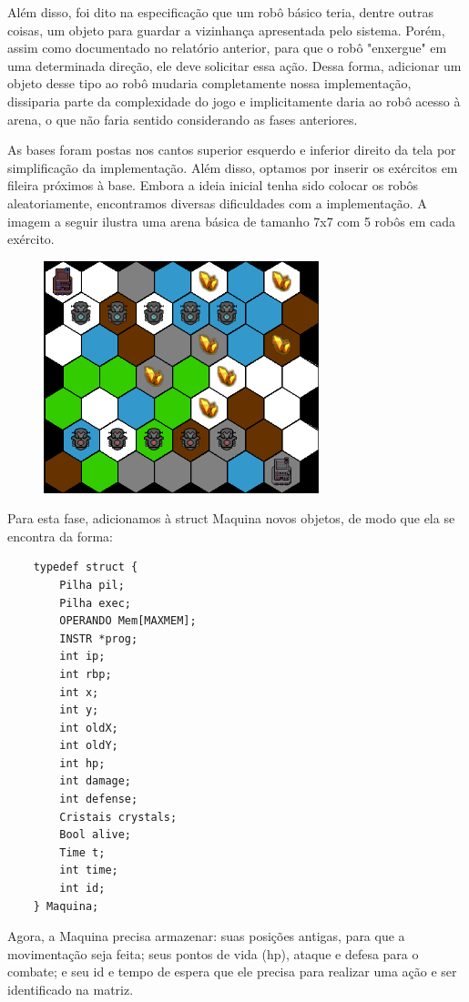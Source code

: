 \documentclass{article}
\begin{document}
    Além disso, foi dito na especificação que um robô básico teria, dentre outras coisas, um objeto para guardar a vizinhança apresentada pelo sistema. Porém, assim como documentado no relatório anterior, para que o robô "enxergue" em uma determinada direção, ele deve solicitar essa ação. Dessa forma, adicionar um objeto desse tipo ao robô mudaria completamente nossa implementação, dissiparia parte da complexidade do jogo e implicitamente daria ao robô acesso à arena, o que não faria sentido considerando as fases anteriores.
    
    As bases foram postas nos cantos superior esquerdo e inferior direito da tela por simplificação da implementação. Além disso, optamos por inserir os exércitos em fileira próximos à base. Embora a ideia inicial tenha sido colocar os robôs aleatoriamente, encontramos diversas dificuldades com a implementação. A imagem a seguir ilustra uma arena básica de tamanho 7x7 com 5 robôs em cada exército. 
    
    \begin{figure}[h]
        \includegraphics[width=8cm]{7x7.png}
        \centering
    \end{figure}
    
    Para esta fase, adicionamos à struct Maquina novos objetos, de modo que ela se encontra da forma:
    
    \begin{lstlisting}
    typedef struct {  
    	Pilha pil;
    	Pilha exec;
    	OPERANDO Mem[MAXMEM];
    	INSTR *prog;
    	int ip;
    	int rbp;
    	int x;
    	int y;
    	int oldX;
    	int oldY;
    	int hp;
    	int damage;
    	int defense;
    	Cristais crystals;
    	Bool alive;
    	Time t;
    	int time;
    	int id;
    } Maquina;
    \end{lstlisting}
    Agora, a Maquina precisa armazenar: suas posições antigas, para que a movimentação seja feita; seus pontos de vida (hp), ataque e defesa para o combate; e seu id e tempo de espera que ele precisa para realizar uma ação e ser identificado na matriz.  
    
\end{document}
